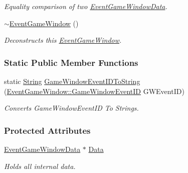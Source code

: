 \begin{DoxyCompactItemize}
\begin{DoxyCompactList}\small\item\em Equality comparison of two \hyperlink{classMezzanine_1_1EventGameWindowData}{EventGameWindowData}. \item\end{DoxyCompactList}\item 
\hypertarget{classMezzanine_1_1EventGameWindow_a68195b843c1126e30846e791c7ef3d99}{
\hyperlink{classMezzanine_1_1EventGameWindow_a68195b843c1126e30846e791c7ef3d99}{$\sim$EventGameWindow} ()}
\label{classMezzanine_1_1EventGameWindow_a68195b843c1126e30846e791c7ef3d99}

\begin{DoxyCompactList}\small\item\em Deconstructs this \hyperlink{classMezzanine_1_1EventGameWindow}{EventGameWindow}. \item\end{DoxyCompactList}\end{DoxyCompactItemize}
\subsubsection*{Static Public Member Functions}
\begin{DoxyCompactItemize}
\item 
static \hyperlink{namespaceMezzanine_acf9fcc130e6ebf08e3d8491aebcf1c86}{String} \hyperlink{classMezzanine_1_1EventGameWindow_a0f4f76cc85926b7687187a1260427b60}{GameWindowEventIDToString} (\hyperlink{classMezzanine_1_1EventGameWindow_a0f0ff29853317334f018bcf48d502af2}{EventGameWindow::GameWindowEventID} GWEventID)
\begin{DoxyCompactList}\small\item\em Converts GameWindowEventID To Strings. \item\end{DoxyCompactList}\end{DoxyCompactItemize}
\subsubsection*{Protected Attributes}
\begin{DoxyCompactItemize}
\item 
\hypertarget{classMezzanine_1_1EventGameWindow_a5db6d56993dada5f413f3564cc990ad4}{
\hyperlink{classMezzanine_1_1EventGameWindowData}{EventGameWindowData} $\ast$ \hyperlink{classMezzanine_1_1EventGameWindow_a5db6d56993dada5f413f3564cc990ad4}{Data}}
\label{classMezzanine_1_1EventGameWindow_a5db6d56993dada5f413f3564cc990ad4}

\begin{DoxyCompactList}\small\item\em Holds all internal data. \item\end{DoxyCompactList}\end{DoxyCompactItemize}


